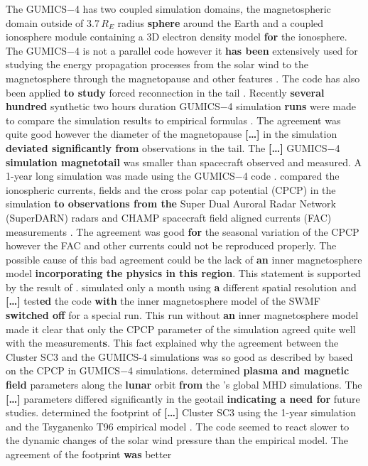 \documentclass[linenumbers,draft]{agujournal}
\begin{document}
The GUMICS$-$4 has two coupled simulation domains, the magnetospheric domain outside of 3.7\,$R_E$ radius \textbf{sphere} around the Earth and a coupled ionosphere module containing a 3D electron density model \textbf{for} the ionosphere. The GUMICS$-$4 is not a parallel code however it \textbf{has been} extensively used for studying the energy propagation processes from the solar wind to the magnetosphere through the magnetopause and other features \citep[][see the references therein]{janhunen12:_gumic_mhd}. The code has also been applied \textbf{to study} forced reconnection in the tail \citep{voeroes14:_winds_condit_ram_co_ram}. Recently \textbf{several hundred} synthetic two hours duration GUMICS$-$4 simulation \textbf{runs} were made to compare the simulation results to empirical formulas \citep{gordeev13:_verif_gumic_mhd}. The agreement was quite good however the diameter of the magnetopause \textbf{[\dots]} in the simulation \textbf{deviated significantly from} observations in the tail. The \textbf{[\dots]} GUMICS$-$4 \textbf{simulation magnetotail} was smaller than spacecraft observed and measured. A 1-year long simulation was made using the GUMICS$-$4 code \citep{facsko16:_one_earth}. \citet{juusola14:_statis_gumic_mhd} compared the ionospheric currents, fields and the cross polar cap potential (CPCP) in the simulation \textbf{to observations from the} Super Dual Auroral Radar Network (SuperDARN) radars \citep{greenwald95:_darn_super} and CHAMP spacecraft \citep{reigber02:_champ} field aligned currents (FAC) measurements \citep{juusola07:_hall_peder_champ,ritter04:_ionos_champ_image}. The agreement was good \textbf{for} the seasonal variation of the CPCP however the FAC and other currents could not be reproduced properly. The possible cause of this bad agreement could be the lack of \textbf{an} inner magnetosphere model \textbf{incorporating the physics in this region}. This statement is supported by the result of \citet{haiducek17:_swmf_global_magnet_simul_januar}. \citeauthor{haiducek17:_swmf_global_magnet_simul_januar} simulated only a month using \textbf{a} different spatial resolution and \textbf{[\dots]} test\textbf{ed} the code \textbf{with} the inner magnetosphere model of the SWMF \textbf{switched off} for a special run. This run without \textbf{an} inner magnetosphere model made it clear that only the CPCP parameter of the simulation agreed quite well with the measurement\textbf{s}. This fact explained why the agreement between the Cluster SC3 and the GUMICS-4 simulations was so good as described by \textbf{\citet{lakka18:_cross_polar_cap_satur_gumic,lakka18:_icme_earth_mach}} based on the CPCP in GUMICS$-$4 simulations. \citet{kallio15:_proper} determined \textbf{plasma and magnetic field} parameters along the \textbf{lunar} orbit \textbf{from} the \citet{facsko16:_one_earth}'s global MHD simulations. The \textbf{[\dots]} parameters differed significantly in the geotail \textbf{indicating a need for} future studies. \citet{facsko16:_one_earth} determined the footprint of \textbf{[\dots]} Cluster SC3 using the 1-year simulation and the Tsyganenko T96 empirical model \citep{tsyganenko95:_model_earth}. The code seemed to react slower to the dynamic changes of the solar wind pressure than the empirical model. The agreement of the footprint \textbf{was} better 
\end{document}
